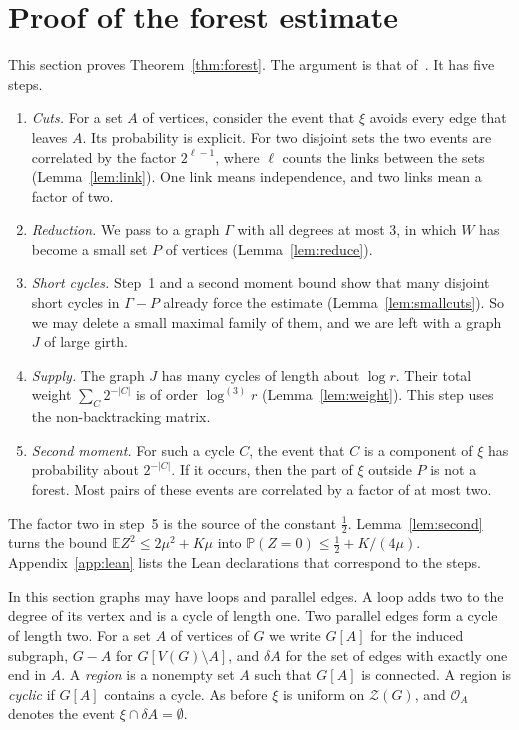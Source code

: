 \documentclass[11pt]{article}
\theoremstyle{definition}
\theoremstyle{remark}
\newcommand{\Z}{\mathcal{Z}}
\newcommand{\PP}{\mathbb{P}}
\newcommand{\EE}{\mathbb{E}}
\newcommand{\lgk}[1]{\log^{(#1)}}
\newcommand{\sm}{\setminus}
\newcommand{\half}{\tfrac12}
\newcommand{\cO}{\mathcal{O}}
\numberwithin{equation}{section}
\begin{document}
\section{Proof of the forest estimate}\label{sec:forest}

This section proves Theorem~\ref{thm:forest}. The argument is that of~\cite{KNT}. It has five steps.
\begin{enumerate}
\item \emph{Cuts.} For a set $A$ of vertices, consider the event that $\xi$ avoids every edge that
leaves $A$. Its probability is explicit. For two disjoint sets the two events are correlated by the
factor $2^{\ell-1}$, where $\ell$ counts the links between the sets (Lemma~\ref{lem:link}). One link
means independence, and two links mean a factor of two.
\item \emph{Reduction.} We pass to a graph $\Gamma$ with all degrees at most $3$, in which $W$ has
become a small set $P$ of vertices (Lemma~\ref{lem:reduce}).
\item \emph{Short cycles.} Step~1 and a second moment bound show that many disjoint short cycles in
$\Gamma-P$ already force the estimate (Lemma~\ref{lem:smallcuts}). So we may delete a small maximal
family of them, and we are left with a graph $J$ of large girth.
\item \emph{Supply.} The graph $J$ has many cycles of length about $\log r$. Their total weight
$\sum_C2^{-|C|}$ is of order $\lgk3r$ (Lemma~\ref{lem:weight}). This step uses the non-backtracking
matrix.
\item \emph{Second moment.} For such a cycle $C$, the event that $C$ is a component of $\xi$ has
probability about $2^{-|C|}$. If it occurs, then the part of $\xi$ outside $P$ is not a forest. Most
pairs of these events are correlated by a factor of at most two.
\end{enumerate}
The factor two in step~5 is the source of the constant $\half$. Lemma~\ref{lem:second} turns the
bound $\EE Z^{2}\le2\mu^{2}+K\mu$ into $\PP(Z=0)\le\half+K/(4\mu)$. Appendix~\ref{app:lean} lists the
Lean declarations that correspond to the steps.

In this section graphs may have loops and parallel edges. A loop adds two to the degree of its vertex
and is a cycle of length one. Two parallel edges form a cycle of length two. For a set $A$ of
vertices of $G$ we write $G[A]$ for the induced subgraph, $G-A$ for $G[V(G)\sm A]$, and $\delta A$
for the set of edges with exactly one end in $A$. A \emph{region} is a nonempty set $A$ such that
$G[A]$ is connected. A region is \emph{cyclic} if $G[A]$ contains a cycle. As before $\xi$ is
uniform on $\Z(G)$, and $\cO_A$ denotes the event $\xi\cap\delta A=\emptyset$.
\end{document}

